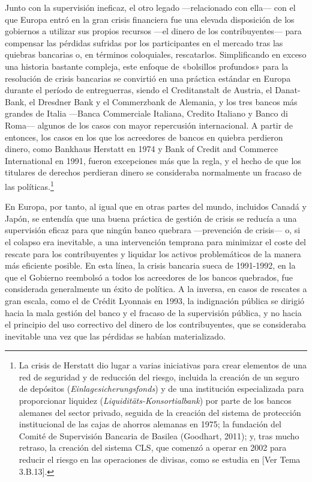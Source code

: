 \documentclass[10pt,a4paper]{article}
\newcommand{\authorfont}[1]{{\fontfamily{EBGaramond-TLF}\selectfont #1}}
\begin{document}
{Junto con la supervisión ineficaz, el otro legado —relacionado con ella— con el que Europa entró en la gran crisis financiera fue una elevada disposición de los gobiernos a utilizar sus propios recursos —el dinero de los contribuyentes— para compensar las pérdidas sufridas por los participantes en el mercado tras las quiebras bancarias o, en términos coloquiales, rescatarlos. Simplificando en exceso una historia bastante compleja, este enfoque de «bolsillos profundos» para la resolución de crisis bancarias se convirtió en una práctica estándar en Europa durante el período de entreguerras, siendo el Creditanstalt de Austria, el Danat-Bank, el Dresdner Bank y el Commerzbank de Alemania, y los tres bancos más grandes de Italia —Banca Commerciale Italiana, Credito Italiano y Banco di Roma— algunos de los casos con mayor repercusión internacional. A partir de entonces, los casos en los que los acreedores de bancos en quiebra perdieron dinero, como Bankhaus Herstatt en 1974 y Bank of Credit and Commerce International en 1991, fueron excepciones más que la regla, y el hecho de que los titulares de derechos perdieran dinero se consideraba normalmente un fracaso de las políticas.\footnote{%
    La crisis de Herstatt dio lugar a varias iniciativas para crear elementos de una red de seguridad y de reducción del riesgo, incluida la creación de un seguro de depósitos (\textit{Einlagesicherungsfonds}) y de una institución especializada para proporcionar liquidez (\textit{Liquiditäts-Konsortialbank}) por parte de los bancos alemanes del sector privado, seguida de la creación del sistema de protección institucional de las cajas de ahorros alemanas en 1975; la fundación del Comité de Supervisión Bancaria de Basilea (Goodhart, 2011); y, tras mucho retraso, la creación del sistema CLS, que comenzó a operar en 2002 para reducir el riesgo en las operaciones de divisas, como se estudia en [\authorfont{Ver Tema 3.B.13}].
}

En Europa, por tanto, al igual que en otras partes del mundo, incluidos Canadá y Japón, se entendía que una buena práctica de gestión de crisis se reducía a una supervisión eficaz para que ningún banco quebrara —prevención de crisis— o, si el colapso era inevitable, a una intervención temprana para minimizar el coste del rescate para los contribuyentes y liquidar los activos problemáticos de la manera más eficiente posible. En esta línea, la crisis bancaria sueca de 1991-1992, en la que el Gobierno reembolsó a todos los acreedores de los bancos quebrados, fue considerada generalmente un éxito de política. A la inversa, en casos de rescates a gran escala, como el de Crédit Lyonnais en 1993, la indignación pública se dirigió hacia la mala gestión del banco y el fracaso de la supervisión pública, y no hacia el principio del uso correctivo del dinero de los contribuyentes, que se consideraba inevitable una vez que las pérdidas se habían materializado.

}
\end{document}
